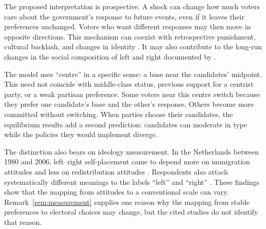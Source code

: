 \documentclass[12pt,letterpaper]{article}
\begin{document}
The proposed interpretation is prospective. A shock can change how much voters care about the government's response to future events, even if it leaves their preferences unchanged. Voters who want different responses may then move in opposite directions. This mechanism can coexist with retrospective punishment, cultural backlash, and changes in identity \citep{GurievPapaioannou2022}. It may also contribute to the long-run changes in the social composition of left and right documented by \citet{Gethin2022}.

The model uses ``centre'' in a specific sense: a base near the candidates' midpoint. This need not coincide with middle-class status, previous support for a centrist party, or a weak partisan preference. Some voters near this centre switch because they prefer one candidate's base and the other's response. Others become more committed without switching. When parties choose their candidates, the equilibrium results add a second prediction: candidates can moderate in type while the policies they would implement diverge.

The distinction also bears on ideology measurement. In the Netherlands between 1980 and 2006, left--right self-placement came to depend more on immigration attitudes and less on redistribution attitudes \citep{deVries2013}. Respondents also attach systematically different meanings to the labels ``left'' and ``right'' \citep{Bauer2017}. These findings show that the mapping from attitudes to a conventional scale can vary. Remark~\ref{rem:measurement} supplies one reason why the mapping from stable preferences to electoral choices may change, but the cited studies do not identify that reason.
\end{document}
